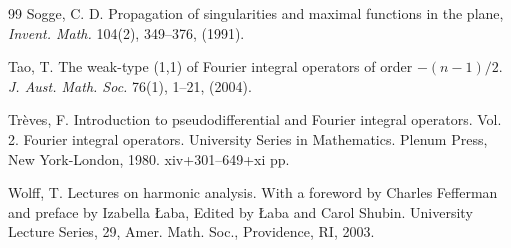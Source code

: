 \documentclass[12pt, reqno]{amsart}
\theoremstyle{definition}
\theoremstyle{remark}
\numberwithin{equation}{section}
\begin{document}
\begin{thebibliography}{99}
  Sogge, C. D. Propagation of singularities and maximal functions in the plane, {\it Invent. Math.} 104(2), 349--376, (1991). 


  Tao, T. The weak-type (1,1) of Fourier integral operators of order $ -(n-1)/2.$ {\it  J. Aust. Math. Soc.} 76(1), 1--21, (2004).

  Trèves, F. Introduction to pseudodifferential and Fourier integral operators. Vol. 2. Fourier integral operators. University Series in Mathematics. Plenum Press, New York-London, 1980. xiv+301–649+xi pp. 

 Wolff, T. Lectures on harmonic analysis. With a foreword by Charles Fefferman
and preface by Izabella Łaba, Edited by Łaba and Carol Shubin. University
Lecture Series, 29, Amer. Math. Soc., Providence, RI, 2003.

\end{thebibliography}
\end{document}
